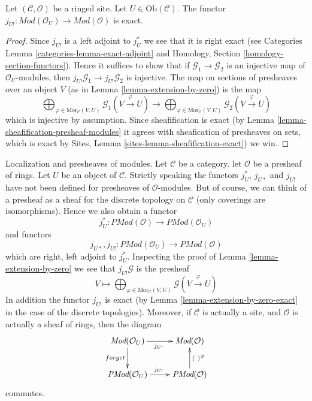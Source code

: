 \begin{lemma}
\label{lemma-extension-by-zero-exact}
Let $(\mathcal{C}, \mathcal{O})$ be a ringed site.
Let $U \in \text{Ob}(\mathcal{C})$.
The functor
$j_{U!} : \textit{Mod}(\mathcal{O}_U) \to \textit{Mod}(\mathcal{O})$
is exact.
\end{lemma}

\begin{proof}
Since $j_{U!}$ is a left adjoint to $j_U^*$ we see that it is right exact
(see Categories Lemma \ref{categories-lemma-exact-adjoint}
and Homology, Section \ref{homology-section-functors}).
Hence it suffices to show that if $\mathcal{G}_1 \to \mathcal{G}_2$
is an injective map of $\mathcal{O}_U$-modules, then
$j_{U!}\mathcal{G}_1 \to j_{U!}\mathcal{G}_2$ is injective.
The map on sections of presheaves over an object $V$
(as in Lemma \ref{lemma-extension-by-zero}) is the map
$$
\bigoplus\nolimits_{\varphi \in \text{Mor}_{\mathcal{C}}(V, U)}
\mathcal{G}_1(V \xrightarrow{\varphi} U)
\longrightarrow
\bigoplus\nolimits_{\varphi \in \text{Mor}_{\mathcal{C}}(V, U)}
\mathcal{G}_2(V \xrightarrow{\varphi} U)
$$
which is injective by assumption. Since sheafification is exact (by
Lemma \ref{lemma-sheafification-presheaf-modules}
it agrees with sheafication of presheaves on sets, which is exact
by Sites, Lemma \ref{sites-lemma-sheafification-exact}) we win.
\end{proof}

\begin{remark}
\label{remark-localization-presheaves}
Localization and presheaves of modules.
Let $\mathcal{C}$ be a category.
let $\mathcal{O}$ be a presheaf of rings.
Let $U$ be an object of $\mathcal{C}$.
Strictly speaking the functors $j_U^*$, $j_{U*}$ and $j_{U!}$
have not been defined for presheaves of $\mathcal{O}$-modules.
But of course, we can think of a presheaf as a sheaf for the
discrete topology on $\mathcal{C}$ (only coverings are isomorphisms).
Hence we also obtain a functor
$$
j_U^* :
\textit{PMod}(\mathcal{O})
\longrightarrow
\textit{PMod}(\mathcal{O}_U)
$$
and functors
$$
j_{U*}, j_{U!} :
\textit{PMod}(\mathcal{O}_U)
\longrightarrow
\textit{PMod}(\mathcal{O})
$$
which are right, left adjoint to $j_U^*$. Inspecting the proof of
Lemma \ref{lemma-extension-by-zero} we see that $j_{U!}\mathcal{G}$
is the presheaf
$$
V \longmapsto
\bigoplus\nolimits_{\varphi \in \text{Mor}_{\mathcal{C}}(V, U)}
\mathcal{G}(V \xrightarrow{\varphi} U)
$$
In addition the functor $j_{U!}$ is exact (by
Lemma \ref{lemma-extension-by-zero-exact} in the
case of the discrete topologies). Moreover, if $\mathcal{C}$
is actually a site, and $\mathcal{O}$ is actually a sheaf of rings,
then the diagram
$$
\xymatrix{
\textit{Mod}(\mathcal{O}_U) \ar[r]_{j_{U!}} \ar[d]_{forget} &
\textit{Mod}(\mathcal{O}) \\
\textit{PMod}(\mathcal{O}_U) \ar[r]^{j_{U!}} &
\textit{PMod}(\mathcal{O}) \ar[u]_{(\ )^\#}
}
$$
commutes.
\end{remark}









